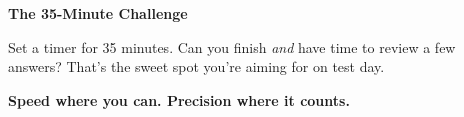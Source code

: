 {\begin{tcolorbox}[
    enhanced,
    colback=funYellowLight,
    colframe=funYellow!60,
    arc=10pt,
    boxrule=1pt,
    left=6mm, right=6mm, top=4mm, bottom=4mm,
]
{\bfseries\color{funYellowDark} \faLightbulb\hspace{2mm}The 35-Minute Challenge}

\vspace{2mm}

Set a timer for 35 minutes. Can you finish \textit{and} have time to review a few answers? That's the sweet spot you're aiming for on test day.
\end{tcolorbox}

\vspace{4mm}

\begin{center}
{\large\bfseries\color{funPurpleDark} \faTachometerAlt\hspace{2mm}Speed where you can. Precision where it counts.\hspace{2mm}\faTachometerAlt}
\end{center}

}
\newpage
